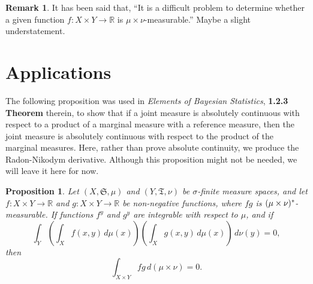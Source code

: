 \documentclass[
twoside=true,
paper=letter,
fontsize=11pt,
pagesize=auto,
leqno,
openany,
headsepline,
overfullrule,
]{scrbook}
\theoremstyle{plain}
\theoremstyle{plain}
\newtheorem{prop}[thm]{Proposition}
\theoremstyle{definition}
\newtheorem{rmk}[thm]{Remark}
\theoremstyle{bfnoteitalic}
\theoremstyle{bfnoteroman}
\newcommand{\sigalg}[1]{\mathfrak{#1}}
\newcommand{\textsigma}{\hbox{\large{$\sigma$}}\kern-1pt}
\newcommand{\R}{\mathbb{R}}
\newcommand{\semiring}{\sigalg{S}}
\newcommand{\semiringii}{\sigalg{T}}
\newcommand{\kernast}{\ast\kern-1pt}
\newcommand{\function}{f}
\newcommand{\functionii}{g}
\newcommand{\measurespace}{X}
\newcommand{\measurespaceii}{Y}
\newcommand{\mspaceelt}{x}
\newcommand{\mspaceeltii}{y}
\newcommand{\measure}{\mu}
\newcommand{\measmu}{\mu}
\newcommand{\measureii}{\nu}
\newcommand{\measnu}{\nu}
\begin{document}
\begin{rmk}
It has been said that, ``It is a difficult problem to determine whether a given function 
$\function:\measurespace\times\measurespaceii\to\R$ is $\measmu\times\measnu$-measurable.''
Maybe a slight understatement.
\end{rmk}


\section{Applications}\label{product_integration_applications}

The following proposition was used in
\textsl{Elements of Bayesian Statistics},
\textbf{1.2.3 Theorem}
therein, to show that if a joint measure is absolutely continuous with respect to a product of a marginal measure with a reference measure, then the joint measure is absolutely continuous with respect to the product of the marginal measures.  Here, rather than prove absolute continuity, we produce the Radon-Nikodym derivative.  Although this proposition might not be needed, we will leave it here for now.

\begin{prop}\label{integral_of_product}
Let 
$(\measurespace, \semiring, \measure)$
and
$(\measurespaceii, \semiringii, \measureii)$
be \textsigma-finite measure spaces, and let
$\function:\measurespace\times\measurespaceii\to\R$ and
$\functionii:\measurespace\times\measurespaceii\to\R$ be
non-negative functions, where $\function\functionii$ is
$(\measure\times\measureii)^\kernast$\hyp{}measurable.
If functions
$\function^\mspaceeltii$ and $\functionii^\mspaceeltii$
are integrable with respect to $\measure$, and if
\[
\int_\measurespaceii
\left( \int_\measurespace\function(\mspaceelt,\mspaceeltii)\,d\measure(\mspaceelt) \right)
\left( \int_\measurespace\functionii(\mspaceelt,\mspaceeltii)\,d\measure(\mspaceelt) \right)
\,d\measureii(\mspaceeltii)
= 0,
\]
then \[
\int_{\measurespace\times\measurespaceii}\function\functionii
\, d(\measure\times\measureii)
= 0.
\]
\end{prop}
\end{document}
